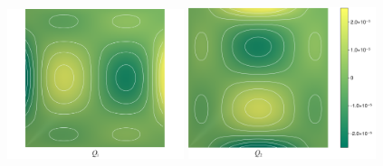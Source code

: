 \begin{figure}[H]
    \centering
    \begin{subcaptiongroup}
    \includegraphics[width=0.46\textwidth]{figures/shearlocking/plate_exactQ1_solution.png}
    \includegraphics[width=0.49\textwidth]{figures/shearlocking/plate_exactQ2_solution.png}
    \end{subcaptiongroup}
\caption{}
\label{plate_exact_solution}
\end{figure}

